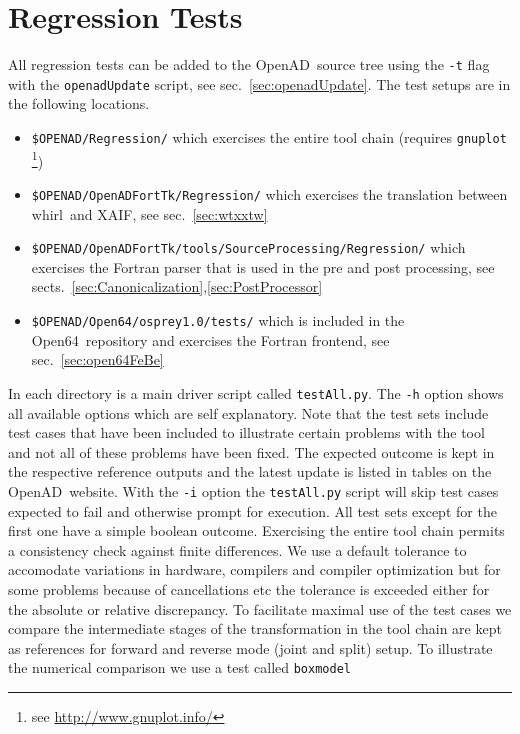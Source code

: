 \documentclass{book}
\newcommand{\OpenAD}{OpenAD}
\newcommand{\OpenSixtyFour}{Open64}
\newcommand{\xaif}{XAIF}
\newcommand{\whirl}{whirl}
\newcommand{\refsec}[1]{{sec.~\ref{#1}}}
\newcommand{\refsecs}[2]{{sects.~\ref{#1},\ref{#2}}}
\begin{document}
\section{Regression Tests}\label{sec:regression}
All regression tests can be added to the \OpenAD\ source tree using the \lstinline{-t} 
flag with the \lstinline{openadUpdate} script, see \refsec{sec:openadUpdate}.
The  test setups are in the following locations. 
\begin{itemize}
\item\lstinline{$OPENAD/Regression/}%
which exercises the entire tool chain (requires \lstinline{gnuplot} \footnote{
see \url{http://www.gnuplot.info/}})
\item\lstinline{$OPENAD/OpenADFortTk/Regression/}%
which exercises the translation between \whirl\ and \xaif, see \refsec{sec:wtxxtw} 
\item\lstinline{$OPENAD/OpenADFortTk/tools/SourceProcessing/Regression/}%
which exercises the Fortran parser that is used in the pre and post processing, see \refsecs{sec:Canonicalization}{sec:PostProcessor} 
\item\lstinline{$OPENAD/Open64/osprey1.0/tests/}%
which is included in the \OpenSixtyFour\ repository and exercises the Fortran frontend, see \refsec{sec:open64FeBe}
\end{itemize}
In each directory is a main driver script called \lstinline{testAll.py}. 
The \lstinline{-h} option shows all available options which are self 
explanatory.  Note that the test sets include test cases that have been included 
to illustrate certain problems with the tool and not all of these problems have 
been fixed. The expected outcome is kept in the respective reference outputs 
and the latest update is listed in tables on the \OpenAD\ website. 
With the \lstinline{-i} option the \lstinline{testAll.py} script will skip test cases  
expected to fail and otherwise prompt for execution. 
All test sets except for the first one have a simple boolean outcome. 
Exercising the entire tool chain permits a consistency check against finite differences. 
We use a default tolerance to accomodate variations in hardware, compilers and 
compiler optimization but for 
some problems because of cancellations etc the tolerance is exceeded either for the 
absolute or relative discrepancy. 
To facilitate maximal use of the test cases we  compare the  intermediate stages of the 
transformation in the tool chain are kept as references for forward and reverse mode (joint and 
split) setup. To illustrate the numerical comparison we use a test called \lstinline{boxmodel}
\end{document}
